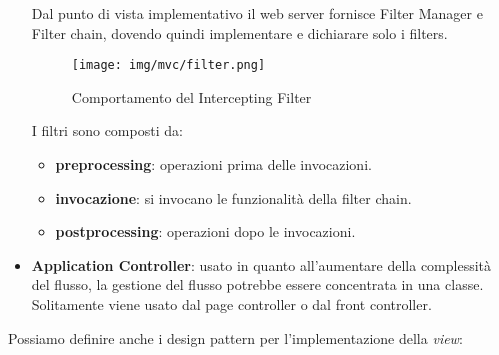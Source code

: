 \begin{itemize}
            Dal punto di vista implementativo il web server fornisce Filter
            Manager e Filter chain, dovendo quindi implementare e dichiarare
            solo i filters.
            \begin{figure}[!ht]
                  \centering
                  \texttt{[image: img/mvc/filter.png]}
                  \caption{Comportamento del Intercepting Filter}
            \end{figure}
            I filtri sono composti da:
            \begin{itemize}
                  \item \textbf{preprocessing}: operazioni prima delle invocazioni.
                  \item \textbf{invocazione}: si invocano le funzionalità della
                        filter chain.
                  \item \textbf{postprocessing}: operazioni dopo le invocazioni.
            \end{itemize}
      \item \textbf{Application Controller}: usato in quanto all'aumentare della
            complessità del flusso, la gestione del flusso potrebbe essere
            concentrata in una classe. Solitamente viene usato dal page controller
            o dal front controller.
\end{itemize}
Possiamo definire anche i design pattern per l'implementazione della \textit{view}:
